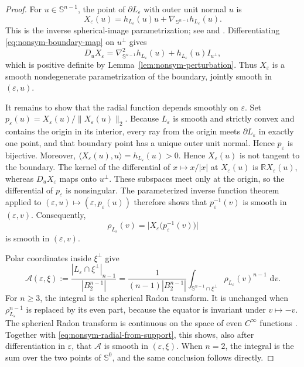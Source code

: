 \documentclass[11pt]{article}
\theoremstyle{remark}
\newcommand{\R}{\mathbb{R}}
\newcommand{\Sph}{\mathbb{S}}
\newcommand{\dd}{\,\mathrm{d}}
\begin{document}
\begin{proof}
For $u\in\Sph^{n-1}$, the point of $\partial L_\varepsilon$ with outer
unit normal $u$ is
\begin{equation}\label{eq:nonsym-boundary-map}
 X_\varepsilon(u)=h_{L_\varepsilon}(u)u
                 +\nabla_{\Sph^{n-1}}h_{L_\varepsilon}(u).
\end{equation}
This is the inverse spherical-image parametrization; see
\cite[Section~0.9, especially p.~24]{GardnerBook} and
\cite[Corollary~1.7.3]{SchneiderBook}.  Differentiating
\eqref{eq:nonsym-boundary-map} on $u^\perp$ gives
\[
 D_uX_\varepsilon
 =\nabla_{\Sph^{n-1}}^2h_{L_\varepsilon}(u)
  +h_{L_\varepsilon}(u)I_{u^\perp},
\]
which is positive definite by Lemma~\ref{lem:nonsym-perturbation}.
Thus $X_\varepsilon$ is a smooth nondegenerate parametrization of the
boundary, jointly smooth in $(\varepsilon,u)$.

It remains to show that the radial function depends smoothly on
$\varepsilon$.  Set $
 p_\varepsilon(u)
 =
 X_\varepsilon(u)/\|X_\varepsilon(u)\|_2.
$ 
Because $L_\varepsilon$ is smooth and strictly convex and contains the
origin in its interior, every ray from the origin meets
$\partial L_\varepsilon$ in exactly one point, and that boundary point
has a unique outer unit normal.  Hence $p_\varepsilon$ is bijective.  Moreover,
$\langle X_\varepsilon(u),u\rangle=h_{L_\varepsilon}(u)>0$.  Hence
$X_\varepsilon(u)$ is not tangent to the boundary.  The kernel of the
differential of $x\mapsto x/|x|$ at $X_\varepsilon(u)$ is
$\R X_\varepsilon(u)$, whereas $D_uX_\varepsilon$ maps onto $u^\perp$.
These subspaces meet only at the origin, so the differential of
$p_\varepsilon$ is nonsingular.  The parameterized inverse function theorem
applied to
$(\varepsilon,u)\mapsto(\varepsilon,p_\varepsilon(u))$ therefore shows that
$p_\varepsilon^{-1}(v)$ is smooth in $(\varepsilon,v)$.  Consequently,
\begin{equation}\label{eq:nonsym-radial-from-support}
 \rho_{L_\varepsilon}(v)
 =\bigl|X_\varepsilon\bigl(p_\varepsilon^{-1}(v)\bigr)\bigr|
\end{equation}
is smooth in $(\varepsilon,v)$.

Polar coordinates inside $\xi^\perp$ give
\begin{equation}\label{eq:nonsym-section-Radon}
 \mathcal A(\varepsilon,\xi)
 :=\frac{|L_\varepsilon\cap\xi^\perp|_{n-1}}{|B_2^{n-1}|}
 =\frac{1}{(n-1)|B_2^{n-1}|}
  \int_{\Sph^{n-1}\cap\xi^\perp}
       \rho_{L_\varepsilon}(v)^{n-1}\,\dd v.
\end{equation}
For $n\geq3$, the integral is the spherical Radon transform.  It is
unchanged when $\rho_{L_\varepsilon}^{n-1}$ is replaced by its even part,
because the equator is invariant under $v\mapsto-v$.  The spherical Radon
transform is continuous on the space of even $C^\infty$ functions
\cite[Theorem~C.2.5]{GardnerBook}.  Together with
\eqref{eq:nonsym-radial-from-support}, this shows, also after
differentiation in $\varepsilon$, that $\mathcal A$ is smooth in
$(\varepsilon,\xi)$.  When $n=2$, the integral is the sum over the two
points of $\Sph^0$, and the same conclusion follows directly.


\end{proof}
\end{document}
